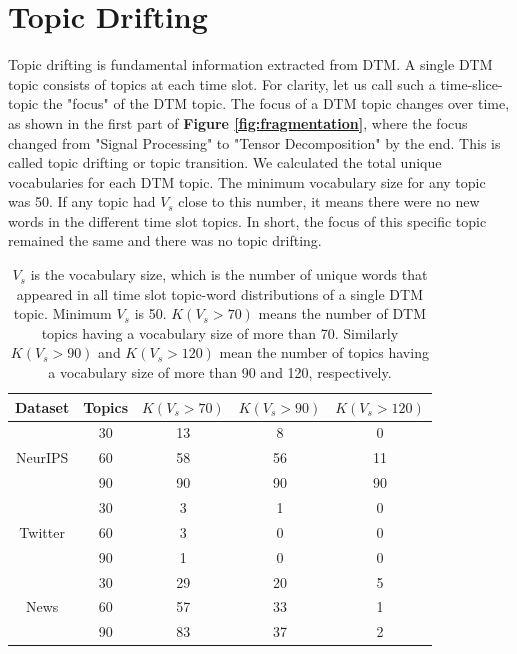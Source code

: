 \section{Topic Drifting}
Topic drifting is fundamental information extracted from DTM. A single DTM topic consists of topics at each time slot. For clarity, let us call such a time-slice-topic the "focus" of the DTM topic. The focus of a DTM topic changes over time, as shown in the first part of \textbf{Figure \ref{fig:fragmentation}}, where the focus changed from "Signal Processing" to "Tensor Decomposition" by the end. This is called topic drifting or topic transition. We calculated the total unique vocabularies for each DTM topic. The minimum vocabulary size for any topic was 50. If any topic had $V_s$ close to this number, it means there were no new words in the different time slot topics. In short, the focus of this specific topic remained the same and there was no topic drifting.

\begin{table}[h!]
\begin{center}
\begin{tabular}{|c|c|c|c|c|}
\hline \textbf{Dataset} & \textbf{Topics} & $K(V_s > 70)$& $K(V_s > 90)$ & $K(V_s > 120)$ \\ \hline

\multirow{3}{*}{NeurIPS}  & 30 & 13 & 8 & 0 \\ & 60 & 58 & 56 & 11  \\ & 90 & 90 & 90 & 90  \\ \hline
\multirow{3}{*}{Twitter}  & 30 & 3 & 1 & 0 \\ & 60 & 3 & 0 & 0 \\ & 90 & 1 & 0 & 0 \\ \hline
\multirow{3}{*}{News}  & 30 & 29 & 20 & 5 \\ & 60 & 57 & 33 & 1 \\ & 90 & 83 & 37 & 2 \\ \hline

\end{tabular}
\caption{$V_s$ is the vocabulary size, which is the number of unique words that appeared in all time slot topic-word distributions of a single DTM topic. Minimum $V_s$ is 50.  $K(V_s > 70)$ means the number of DTM topics having a vocabulary size of more than 70. Similarly $K(V_s > 90)$ and $K(V_s > 120)$ mean the number of topics having a vocabulary size of more than 90 and 120, respectively. }
\label{table:topicDrifting}
\end{center}
\end{table}

